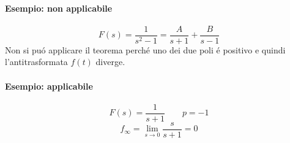 \documentclass[../main.tex]{subfiles}
\begin{document}
	\begin{mdframed}[style=Esempio]
		\paragraph{Esempio: non applicabile}
		\[
			F(s) = \frac{1}{s^2-1} = \frac{A}{s+1} + \frac{B}{s-1}
		\]
		Non si pu\'{o} applicare il teorema perch\'{e} uno dei due poli \'{e} positivo e quindi l'antitrasformata $ f(t) $ diverge.
	\end{mdframed}

	\begin{mdframed}[style=Esempio]
		\paragraph{Esempio: applicabile}
		\[
			F(s) = \frac{1}{s+1} \qquad p = -1
		\]
		\[
			f_\infty = \lim\limits_{s \rightarrow 0} \frac{s}{s+1} = 0
		\]
	\end{mdframed}
		
\end{document}
